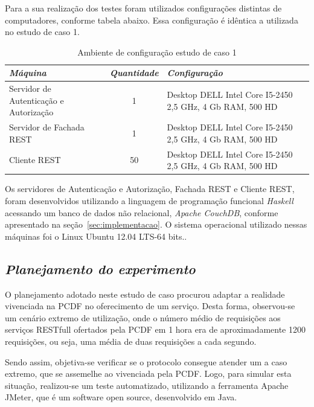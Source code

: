 Para a sua realização dos testes foram utilizados configurações distintas de computadores, conforme tabela abaixo. Essa configuração é idêntica a utilizada no estudo de caso 1.

%
\begin{table}[h]
    \begin{tabular}{|l|c|p{6cm}|}
    \hline
    \textbf{\emph{Máquina }}                   & \textbf{\emph{Quantidade}} & \textbf{\emph{Configuração}}                                                                               \\ \hline
    Servidor de Autenticação e Autorização  & 1          & Desktop DELL Intel Core I5-2450 2,5 GHz, 4 Gb RAM, 500 HD \\ \hline
    Servidor de Fachada REST  & 1          & Desktop DELL Intel Core I5-2450 2,5 GHz, 4 Gb RAM, 500 HD\\ \hline
    Cliente REST                   & 50        & Desktop DELL Intel Core I5-2450 2,5 GHz, 4 Gb RAM, 500 HD                                    \\ \hline
    \end{tabular}
    \caption {Ambiente de configuração estudo de caso 1}\label{tb:estudo_caso2}
\end{table}

Os servidores de Autenticação e Autorização, Fachada REST e Cliente REST, foram desenvolvidos utilizando a linguagem de programação funcional \emph{Haskell} acessando um banco de dados não relacional, \emph{Apache CouchDB}, conforme apresentado na seção~\ref{sec:implementacao}. O sistema operacional utilizado nessas máquinas foi o Linux Ubuntu 12.04 LTS-64 bits..

\subsection{\emph{Planejamento do experimento}}

O planejamento adotado neste estudo de caso procurou adaptar a realidade vivenciada na PCDF no oferecimento de um serviço. Desta forma, observou-se um cenário extremo de utilização, onde o número médio de requisições aos serviços RESTfull ofertados pela PCDF em 1 hora era de aproximadamente 1200 requisições, ou seja, uma média de duas requisições a cada segundo.

Sendo assim, objetiva-se verificar se o protocolo consegue atender um a caso extremo, que se assemelhe ao vivenciada pela PCDF. Logo, para simular esta situação, realizou-se um teste automatizado, utilizando a ferramenta Apache JMeter, que é um software open source, desenvolvido em Java.

